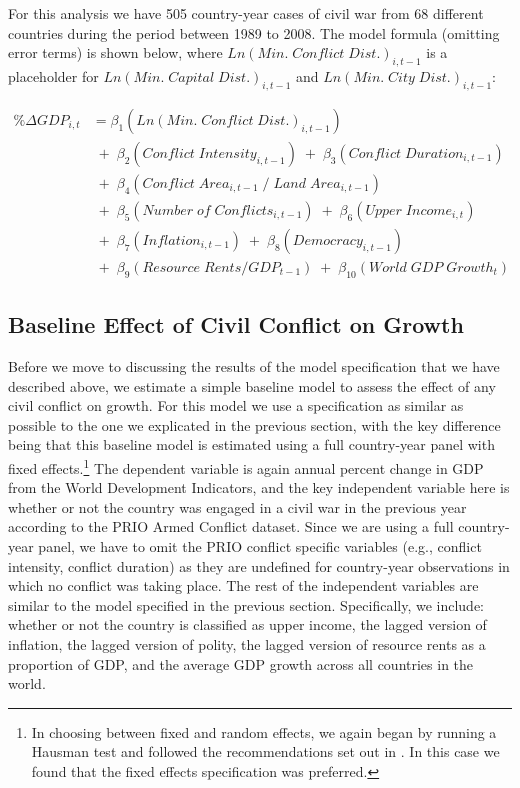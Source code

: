 For this analysis we have 505 country-year cases of civil war from 68 different countries during the period between 1989 to 2008. The model formula (omitting error terms) is shown below, where $Ln(Min. \; Conflict \; Dist.)_{i,t-1}$ is a placeholder for $Ln(Min. \; Capital \; Dist.)_{i,t-1}$ and $Ln(Min. \; City \; Dist.)_{i,t-1}$:

\begin{align*}
	\% \Delta GDP_{i,t} &= \beta_{1}(Ln(Min. \; Conflict \; Dist.)_{i,t-1}) \\
	& \;+\; \beta_{2}(Conflict \; Intensity_{i,t-1}) \;+\; \beta_{3}(Conflict \; Duration_{i,t-1}) \\
	& \;+\; \beta_{4}(Conflict \; Area_{i,t-1} \;/\; Land \; Area_{i,t-1}) \\
	& \;+\; \beta_{5}(Number \; of \; Conflicts_{i,t-1}) \;+\; \beta_{6}(Upper \; Income_{i,t}) \\	
	& \;+\; \beta_{7}(Inflation_{i,t-1}) \;+\; \beta_{8}(Democracy_{i,t-1}) \\
	& \;+\; \beta_{9}(Resource \; Rents/GDP_{t-1}) \;+\; \beta_{10}(World \; GDP \; Growth_{t})
\end{align*}

\subsection{Baseline Effect of Civil Conflict on Growth}

Before we move to discussing the results of the model specification that we have described above, we estimate a simple baseline model to assess the effect of any civil conflict on growth. For this model we use a specification as similar as possible to the one we explicated in the previous section, with the key difference being that this baseline model is estimated using a full country-year panel with fixed effects.\footnote{In choosing between fixed and random effects, we again began by running a Hausman test and followed the recommendations set out in \citet{clark:linzer:2015}. In this case we found that the fixed effects specification was preferred.} The dependent variable is again annual percent change in GDP from the World Development Indicators, and the key independent variable here is whether or not the country was engaged in a civil war in the previous year according to the PRIO Armed Conflict dataset. Since we are using a full country-year panel, we have to omit the PRIO conflict specific variables (e.g., conflict intensity, conflict duration) as they are undefined for country-year observations in which no conflict was taking place. The rest of the independent variables are similar to the model specified in the previous section. Specifically, we include: whether or not the country is classified as upper income, the lagged version of inflation, the lagged version of polity, the lagged version of resource rents as a proportion of GDP, and the average GDP growth across all countries in the world. 

